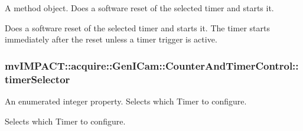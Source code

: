 A method object. Does a software reset of the selected timer and starts it. 

Does a software reset of the selected timer and starts it. The timer starts immediately after the reset unless a timer trigger is active. \hypertarget{classmv_i_m_p_a_c_t_1_1acquire_1_1_gen_i_cam_1_1_counter_and_timer_control_a98aaeada13d3a3f9edc2abfeeba6077e}{
\subsubsection[{timer\+Selector}]{ mv\+I\+M\+P\+A\+C\+T\+::acquire\+::\+Gen\+I\+Cam\+::\+Counter\+And\+Timer\+Control\+::timer\+Selector}}\label{classmv_i_m_p_a_c_t_1_1acquire_1_1_gen_i_cam_1_1_counter_and_timer_control_a98aaeada13d3a3f9edc2abfeeba6077e}


An enumerated integer property. Selects which Timer to configure. 

Selects which Timer to configure.


